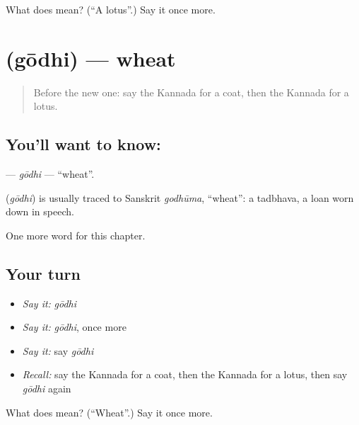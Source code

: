 \begin{tcolorbox}[breakable,colback=teal!4,colframe=teal!35!black,title={Before you move on}]
What does  mean? (\textquotedblleft{}A lotus\textquotedblright{}.) Say it once more.
\end{tcolorbox}
\section[\texorpdfstring{\kn{ಗೋಧಿ} (gōdhi)}{ಗೋಧಿ (gōdhi)}]{ (gōdhi) — wheat}

\label{lesson:KA-C139-godhi}



\begin{quote}
Before the new one: say the Kannada for a coat, then the Kannada for a lotus.
\end{quote}

\subsection*{You'll want to know: }
\textbf{} — \emph{gōdhi} — \textquotedblleft{}wheat\textquotedblright{}.

\begin{cousinweb}
\textbf{} (\emph{gōdhi}) is usually traced to Sanskrit \emph{godhūma}, \textquotedblleft{}wheat\textquotedblright{}: a tadbhava, a loan worn down in speech.
\end{cousinweb}

\begin{grammarlens}[title={What you've built}]
One more word for this chapter.
\end{grammarlens}

\subsection*{Your turn}
\begin{itemize}
\raggedright
  \item \emph{Say it:} \emph{gōdhi}
  \item \emph{Say it:} \emph{gōdhi}, once more
  \item \emph{Say it:} say \emph{gōdhi}
  \item \emph{Recall:} say the Kannada for a coat, then the Kannada for a lotus, then say \emph{gōdhi} again
\end{itemize}

\begin{tcolorbox}[breakable,colback=teal!4,colframe=teal!35!black,title={Before you move on}]
What does  mean? (\textquotedblleft{}Wheat\textquotedblright{}.) Say it once more.
\end{tcolorbox}
